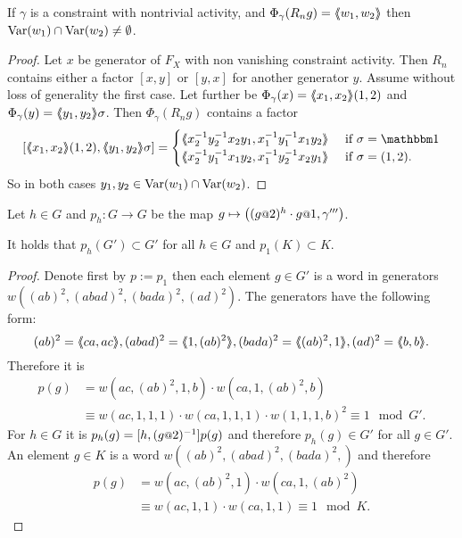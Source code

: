 \documentclass[a4paper,12pt]{article}
\begin{document}
\begin{lem} \label{lem:commonVar}
 If $\gamma$ is a constraint with nontrivial activity, and $\Phi_\gamma(R_ng)=\langle\negthickspace\langle w_1,w_2\rangle\negthickspace\rangle$ then $\textup{Var}(w_1)\cap\textup{Var}(w_2)\neq \emptyset$.
\end{lem}
\begin{proof}
 Let $x$ be generator of $F_X$ with non vanishing constraint activity. 
 Then $R_n$ contains either a factor $[x,y]$ or $[y,x]$ for another generator $y$. Assume without loss of generality the first case.
 Let further be $\Phi_\gamma(x)=\langle\negthickspace\langle x_1,x_2\rangle\negthickspace\rangle(1,2)$ and $\Phi_\gamma(y)=\langle\negthickspace\langle y_1,y_2\rangle\negthickspace\rangle\sigma$. 
 Then $\Phi_\gamma(R_n g)$ contains a factor 
 \[ [\pair{x_1,x_2}(1,2),\pair{y_1,y_2}\sigma] = \begin{cases}
                                                   \pair{x_2^{-1}y_2^{-1}x_2y_1,x_1^{-1}y_1^{-1}x_1y_2} & \textup{ if } \sigma=\id \\
                                                   \pair{x_2^{-1}y_1^{-1}x_1y_2,x_1^{-1}y_2^{-1}x_2y_1} & \textup{ if } \sigma=(1,2) . \\
                                                 \end{cases}
\] So in both cases $y_1,y_2\in \textup{Var}(w_1)\cap \textup{Var}(w_2)$. 
\end{proof}
\begin{lem} \label{lem:productOfStatesIsInDerived} 
 Let $h\in G$ and $p_h\colon G\to G$ be the map $g\mapsto \left((g\at{2})^{h}\cdot g\at{1},\gamma'''\right)$.
 
 It holds that $p_h(G')\subset G'$ for all $h\in G$ and $p_1(K)\subset K$. 
\end{lem}
\begin{proof}
 Denote first by $p:=p_1$ then
 each element $g\in G'$ is a word in generators $w((ab)^2,(abad)^2,(bada)^2,(ad)^2)$. 
 The generators have the following form:
 \[(ab)^2=\pair{ca,ac}, (abad)^2 = \pair{1,(ab)^2}, (bada)^2=\pair{(ab)^2,1}, (ad)^2=\pair{b,b}.\]
 Therefore it is
 \begin{align*}
  p(g) &= w(ac,(ab)^2,1,b) \cdot w(ca,1,(ab)^2,b)\\ &\equiv w(ac,1,1,1) \cdot w(ca,1,1,1) \cdot w(1,1,1,b)^2 \equiv 1 \mod G'.
 \end{align*}
 For $h\in G$ it is $p_h(g)=[h,(g\at{2})^{-1}]p(g)$ and therefore $p_h(g)\in G'$ for all $g\in G'$.
 An element $g\in K$ is a word $w((ab)^2,(abad)^2,(bada)^2,)$ and therefore
 \begin{align*}
  p(g) &= w(ac,(ab)^2,1) \cdot w(ca,1,(ab)^2)\\ &\equiv w(ac,1,1) \cdot w(ca,1,1) \equiv 1 \mod K.
 \end{align*}
\end{proof}
\end{document}
